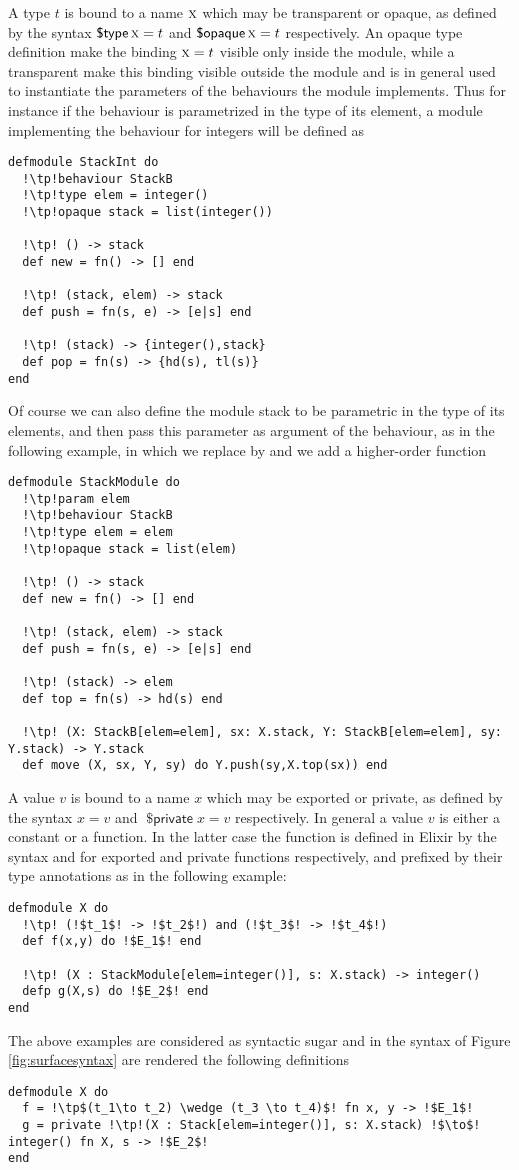 \documentclass[a4paper,10pt]{article}
\DeclareMathOperator{\kwopq}{\textsf{\$opaque}}
\DeclareMathOperator{\kwtp}{\textsf{\$type}}
\DeclareMathOperator{\kwpr}{\textsf{\$private}}
\newcommand{\tx}{\textsc{x}}
\begin{document}
A type $t$ is bound to a name $\tx$ which may be transparent or opaque, as defined by the syntax $\kwtp \tx = t$ and $\kwopq \tx =t$ respectively. An opaque type definition make the binding $\tx= t$ visible only inside the module, while a transparent make this binding visible outside the module and is in general used to instantiate the parameters of the behaviours the module implements. Thus for instance if the  behaviour is parametrized in the type  of its element, a module  implementing the behaviour for integers will be defined as
\begin{verbatim}
defmodule StackInt do
  !\tp!behaviour StackB
  !\tp!type elem = integer()
  !\tp!opaque stack = list(integer())

  !\tp! () -> stack
  def new = fn() -> [] end

  !\tp! (stack, elem) -> stack
  def push = fn(s, e) -> [e|s] end

  !\tp! (stack) -> {integer(),stack}
  def pop = fn(s) -> {hd(s), tl(s)}
end
\end{verbatim}
Of course we can also define the module stack to be parametric in the type of
its elements, and then pass this parameter as argument of the behaviour, as in
the following example, in which we replace  by  and we add a
higher-order function
\begin{verbatim}
defmodule StackModule do
  !\tp!param elem
  !\tp!behaviour StackB
  !\tp!type elem = elem
  !\tp!opaque stack = list(elem)

  !\tp! () -> stack
  def new = fn() -> [] end

  !\tp! (stack, elem) -> stack
  def push = fn(s, e) -> [e|s] end

  !\tp! (stack) -> elem
  def top = fn(s) -> hd(s) end

  !\tp! (X: StackB[elem=elem], sx: X.stack, Y: StackB[elem=elem], sy: Y.stack) -> Y.stack
  def move (X, sx, Y, sy) do Y.push(sy,X.top(sx)) end
\end{verbatim}
A value $v$ is bound to a name $x$ which may be exported or private, as defined by the syntax $x = v$ and $\kwpr x = v$ respectively. In general a value $v$ is either a constant or a function. In the latter case the function is defined in Elixir by the syntax  and  for exported and private functions respectively, and prefixed by their type annotations as in the following example:
\begin{verbatim}
defmodule X do
  !\tp! (!$t_1$! -> !$t_2$!) and (!$t_3$! -> !$t_4$!)
  def f(x,y) do !$E_1$! end

  !\tp! (X : StackModule[elem=integer()], s: X.stack) -> integer()
  defp g(X,s) do !$E_2$! end
end  
\end{verbatim}
The above examples are considered as syntactic sugar and in the syntax of Figure \ref{fig:surfacesyntax} are rendered the following definitions 
\begin{verbatim}
defmodule X do
  f = !\tp$(t_1\to t_2) \wedge (t_3 \to t_4)$! fn x, y -> !$E_1$!
  g = private !\tp!(X : Stack[elem=integer()], s: X.stack) !$\to$! integer() fn X, s -> !$E_2$!
end
\end{verbatim}
\end{document}
